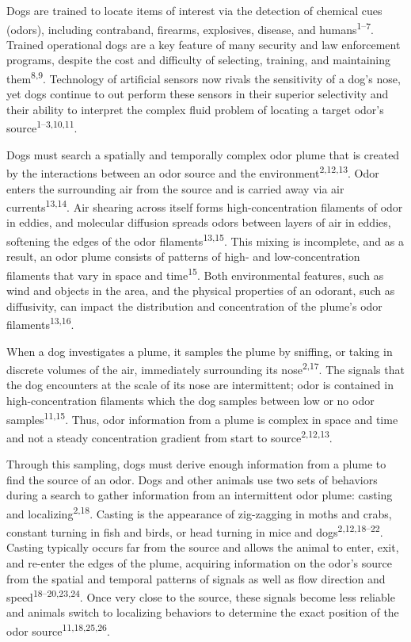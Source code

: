 \documentclass[
]{article}
\begin{document}
Dogs are trained to locate items of interest via the detection of chemical cues (odors), including contraband, firearms, explosives, disease, and humans\textsuperscript{1--7}. Trained operational dogs are a key feature of many security and law enforcement programs, despite the cost and difficulty of selecting, training, and maintaining them\textsuperscript{8,9}. Technology of artificial sensors now rivals the sensitivity of a dog's nose, yet dogs continue to out perform these sensors in their superior selectivity and their ability to interpret the complex fluid problem of locating a target odor's source\textsuperscript{1--3,10,11}.

Dogs must search a spatially and temporally complex odor plume that is created by the interactions between an odor source and the environment\textsuperscript{2,12,13}. Odor enters the surrounding air from the source and is carried away via air currents\textsuperscript{13,14}. Air shearing across itself forms high-concentration filaments of odor in eddies, and molecular diffusion spreads odors between layers of air in eddies, softening the edges of the odor filaments\textsuperscript{13,15}. This mixing is incomplete, and as a result, an odor plume consists of patterns of high- and low-concentration filaments that vary in space and time\textsuperscript{15}. Both environmental features, such as wind and objects in the area, and the physical properties of an odorant, such as diffusivity, can impact the distribution and concentration of the plume's odor filaments\textsuperscript{13,16}.

When a dog investigates a plume, it samples the plume by sniffing, or taking in discrete volumes of the air, immediately surrounding its nose\textsuperscript{2,17}. The signals that the dog encounters at the scale of its nose are intermittent; odor is contained in high-concentration filaments which the dog samples between low or no odor samples\textsuperscript{11,15}. Thus, odor information from a plume is complex in space and time and not a steady concentration gradient from start to source\textsuperscript{2,12,13}.

Through this sampling, dogs must derive enough information from a plume to find the source of an odor. Dogs and other animals use two sets of behaviors during a search to gather information from an intermittent odor plume: casting and localizing\textsuperscript{2,18}. Casting is the appearance of zig-zagging in moths and crabs, constant turning in fish and birds, or head turning in mice and dogs\textsuperscript{2,12,18--22}. Casting typically occurs far from the source and allows the animal to enter, exit, and re-enter the edges of the plume, acquiring information on the odor's source from the spatial and temporal patterns of signals as well as flow direction and speed\textsuperscript{18--20,23,24}. Once very close to the source, these signals become less reliable and animals switch to localizing behaviors to determine the exact position of the odor source\textsuperscript{11,18,25,26}.
\end{document}
